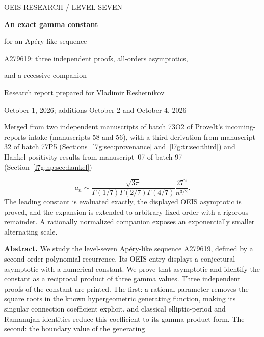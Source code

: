 \documentclass[11pt,letterpaper]{article}
\theoremstyle{remark}\newtheorem{remark}[theorem]{Remark}
\newcounter{l7gtrsavedeq}
\begin{document}
\hypersetup{pageanchor=false}
\begin{titlepage}
\vspace*{0in}
{\large\sffamily\color{MidnightBlue} OEIS RESEARCH \quad / \quad LEVEL SEVEN}\par
\vspace{.18in}
{\huge\bfseries An exact gamma constant\par for an Ap\'ery-like sequence}\par
\vspace{.2in}
{\Large A279619: three independent proofs, all-orders asymptotics,\par and a recessive companion}\par
\vspace{.18in}
{\large Research report prepared for Vladimir Reshetnikov}\par
{\large October 1, 2026; additions October 2 and October 4, 2026}\par
{\normalsize Merged from two independent manuscripts of batch 73O2 of ProveIt's
incoming-reports intake (manuscripts 58 and 56), with a third derivation from
manuscript 32 of batch 77P5 (Sections~\ref{l7g:sec:provenance}
and~\ref{l7g:tr:sec:third}) and Hankel-positivity results from manuscript~07
of batch 97 (Section~\ref{l7g:hp:sec:hankel})}\par
\vspace{.12in}
\begin{resultbox}
\[
 a_n\sim\frac{\sqrt{3\pi}}{\Gamma(1/7)\Gamma(2/7)\Gamma(4/7)}
               \frac{27^n}{n^{3/2}}.
\]
The leading constant is evaluated exactly, the displayed OEIS asymptotic
is proved, and the expansion is extended to arbitrary fixed order with a
rigorous remainder. A rationally normalized companion exposes an
exponentially smaller alternating scale.
\end{resultbox}
\vspace{.08in}
{\small\noindent\textbf{Abstract.}
We study the level-seven Ap\'ery-like sequence A279619, defined by a
second-order polynomial recurrence. Its OEIS entry displays a conjectural
asymptotic with a numerical constant. We prove that asymptotic and identify
the constant as a reciprocal product of three gamma values. Three independent
proofs of the constant are printed. The first: a rational parameter
removes the square roots in the known hypergeometric generating function,
making its singular connection coefficient explicit, and classical
elliptic-period and Ramanujan identities reduce this coefficient to its
gamma-product form. The second: the boundary value of the generating
}
\end{titlepage}
\end{document}
